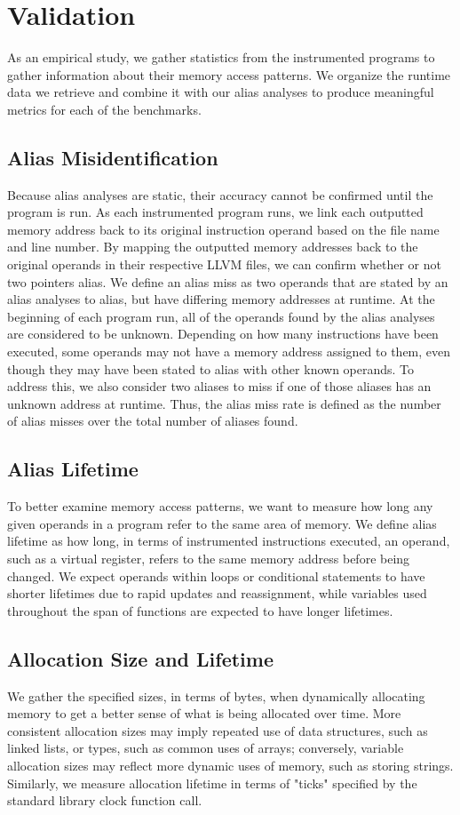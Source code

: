 \chapter{Validation}

As an empirical study, we gather statistics from the instrumented programs to gather information about their memory access patterns. We organize the runtime data we retrieve and combine it with our alias analyses to produce meaningful metrics for each of the benchmarks.

\section{Alias Misidentification}
Because alias analyses are static, their accuracy cannot be confirmed until the program is run. As each instrumented program runs, we link each outputted memory address back to its original instruction operand based on the file name and line number. By mapping the outputted memory addresses back to the original operands in their respective LLVM files, we can confirm whether or not two pointers alias. We define an alias miss as two operands that are stated by an alias analyses to alias, but have differing memory addresses at runtime. At the beginning of each program run, all of the operands found by the alias analyses are considered to be unknown. Depending on how many instructions have been executed, some operands may not have a memory address assigned to them, even though they may have been stated to alias with other known operands. To address this, we also consider two aliases to miss if one of those aliases has an unknown address at runtime. Thus, the alias miss rate is defined as the number of alias misses over the total number of aliases found.

\section{Alias Lifetime}
To better examine memory access patterns, we want to measure how long any given operands in a program refer to the same area of memory. We define alias lifetime as how long, in terms of instrumented instructions executed, an operand, such as a virtual register, refers to the same memory address before being changed. We expect operands within loops or conditional statements to have shorter lifetimes due to rapid updates and reassignment, while variables used throughout the span of functions are expected to have longer lifetimes.

\section{Allocation Size and Lifetime}
We gather the specified sizes, in terms of bytes, when dynamically allocating memory to get a better sense of what is being allocated over time. More consistent allocation sizes may imply repeated use of data structures, such as linked lists, or types, such as common uses of arrays; conversely, variable allocation sizes may reflect more dynamic uses of memory, such as storing strings. Similarly, we measure allocation lifetime in terms of "ticks" specified by the standard library clock function call.
